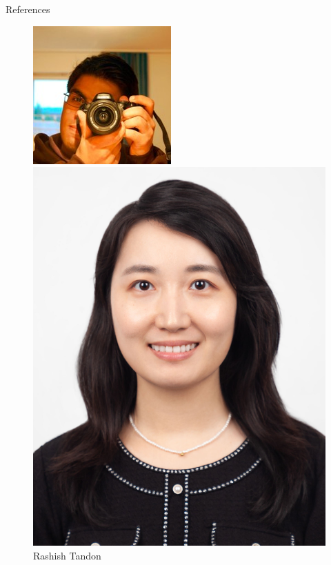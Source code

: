 \documentclass{beamer}
\begin{document}
\begin{frame}{References}
\begin{figure}
    \centering
    \begin{minipage}[t]{.2\paperwidth}
        \centering
        \includegraphics[width=\textwidth]{res/Rashish Tandon.jpg}
        \caption{Rashish Tandon}
    \end{minipage}
    \begin{minipage}[t]{.2\paperwidth}
        \centering
        \includegraphics[width=\textwidth]{res/Qi Lei.jpg}

\end{minipage}
\end{figure}
\end{frame}
\end{document}
